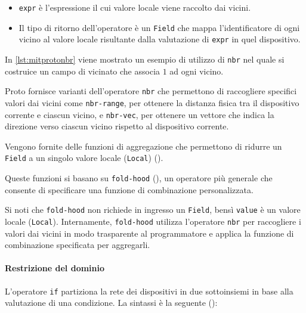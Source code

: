 

\begin{itemize}
    \item \texttt{expr} è l'espressione il cui valore locale viene raccolto dai vicini.
    \item Il tipo di ritorno dell'operatore è un \texttt{Field} che mappa l'identificatore di ogni vicino al valore locale risultante dalla valutazione di \texttt{expr} in quel dispositivo.
\end{itemize}

In \cref{lst:mitprotonbr} viene mostrato un esempio di utilizzo di \texttt{nbr} nel quale si costruice un campo di vicinato che associa \(1\) ad ogni vicino.

Proto fornisce varianti dell'operatore \texttt{nbr} che permettono di raccogliere specifici valori dai vicini come \texttt{nbr-range}, per ottenere la distanza fisica tra il dispositivo corrente e ciascun vicino, e \texttt{nbr-vec}, per ottenere un vettore che indica la direzione verso ciascun vicino rispetto al dispositivo corrente.

Vengono fornite delle funzioni di aggregazione che permettono di ridurre un \texttt{Field} a un singolo valore locale (\texttt{Local}) ().



Queste funzioni si basano su \texttt{fold-hood} (), un operatore più generale che consente di specificare una funzione di combinazione personalizzata.



Si noti che \texttt{fold-hood} non richiede in ingresso un \texttt{Field}, bensì \texttt{value} è un valore locale (\texttt{Local}). Internamente, \texttt{fold-hood} utilizza l'operatore \texttt{nbr} per raccogliere i valori dai vicini in modo trasparente al programmatore e applica la funzione di combinazione specificata per aggregarli.

\paragraph{Restrizione del dominio} L'operatore \texttt{if} partiziona la rete dei dispositivi in due sottoinsiemi in base alla valutazione di una condizione. La sintassi è la seguente ():

